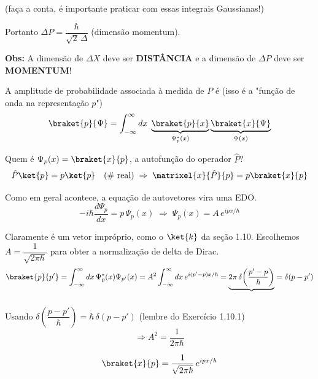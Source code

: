 (faça a conta, é importante praticar com essas integrais Gaussianas!)

Portanto $\boxed{\Delta P = \dfrac{\hbar}{\sqrt{2}\,\Delta}}$ (dimensão momentum).

\noindent\textbf{Obs:} A dimensão de $\Delta X$ deve ser \textbf{DISTÂNCIA} e a dimensão de $\Delta P$ deve ser \textbf{MOMENTUM}!

A amplitude de probabilidade associada à medida de $P$ é (isso é a "função de onda na representação $p$")
\begin{equation}
    \braket{p}{\Psi} = \int_{-\infty}^{\infty} dx\; \underbrace{\braket{p}{x}}_{\Psi_p^*(x)}\underbrace{\braket{x}{\Psi}}_{\Psi(x)}
\label{eq:aula12_p_psi_def}
\end{equation}

Quem é $\Psi_p(x) = \braket{x}{p}$, a autofunção do operador $\hat{P}$?
\begin{equation}
    \hat{P}\ket{p} = p\ket{p} \quad (\text{\# real}) \;\Rightarrow\; \matrixel{x}{\hat{P}}{p} = p\braket{x}{p}
\label{eq:aula12_autofuncao_P_def}
\end{equation}

Como em geral acontece, a equação de autovetores vira uma EDO.
\begin{equation}
    -i\hbar \frac{d\Psi_p}{dx} = p\,\Psi_p(x) \;\Rightarrow\; \Psi_p(x) = A\, e^{ipx/\hbar}
\label{eq:aula12_edo_autofuncao_P}
\end{equation}

Claramente é um vetor impróprio, como o $\ket{k}$ da seção 1.10. Escolhemos $A = \dfrac{1}{\sqrt{2\pi\hbar}}$ para obter a normalização de delta de Dirac.
\begin{equation}
    \braket{p}{p'} = \int_{-\infty}^{\infty} dx\, \Psi_p^*(x)\Psi_{p'}(x) = A^2\int_{-\infty}^{\infty} dx\, e^{i(p'-p)x/\hbar} = \underbrace{2\pi\,\delta\!\left(\frac{p'-p}{\hbar}\right)}_{} = \delta(p-p')
\label{eq:aula12_normalizacao_p}
\end{equation}

Usando $\delta\!\left(\dfrac{p-p'}{\hbar}\right) = \hbar\,\delta(p-p')$ (lembre do Exercício 1.10.1)
\begin{equation}
    \Rightarrow \boxed{A^2 = \frac{1}{2\pi\hbar}}
\label{eq:aula12_A2_resultado}
\end{equation}

\begin{equation}
    \braket{x}{p} = \frac{1}{\sqrt{2\pi\hbar}}\, e^{ipx/\hbar}
\label{eq:aula12_braket_xp}
\end{equation}

